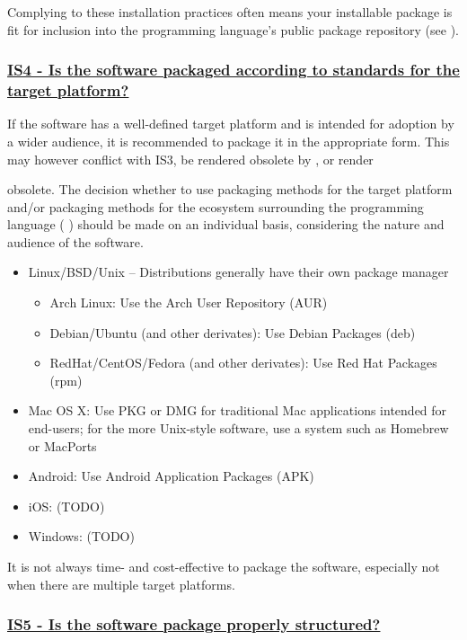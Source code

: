 \documentclass[a4paper,11pt]{article}
\newcommand{\criterion}[2]{\subsubsection*{\underline{#1 - #2}}\label{id:#1}}
\newcommand\CheckTable{%
  \begin{tabular}{ccccc}
    No & Minimal & Adequate & Good & Perfect \\
    0 & 1 & 2 & 3 & 4 \\
    \hline
    $\square$ & $\square$ & $\square$ & $\square$ & $\square$ \\
  \end{tabular}%
}
\newcommand{\refcrit}[1]{%
 \framebox[1.1\width]{\hyperref[id:#1]{#1}}
}
\begin{document}
Complying to these installation practices often means your installable package
is fit for inclusion into the programming language's public package repository
(see \refcrit{AC5}).


\newcommand{\isFourID}{IS4}
\newcommand{\isFourText}{Is the software packaged according to standards for the target platform?}
\criterion{\isFourID}{\isFourText}

If the software has a well-defined target platform and is intended for adoption
by a wider audience, it is recommended to package it in the appropriate form.
This may however conflict with IS3, be rendered obsolete by \refcrit{IS3}, or
render \refcrit{IS3}
obsolete. The decision whether to use packaging methods for the target platform
and/or packaging methods for the ecosystem surrounding the programming language
(\refcrit{IS3}) should be
made on an individual basis, considering the nature and audience of the
software.

\begin{itemize}
    \item Linux/BSD/Unix -- Distributions generally have their own package manager
    \begin{itemize}
        \item Arch Linux: Use the Arch User Repository (AUR)
        \item Debian/Ubuntu (and other derivates): Use Debian Packages (deb)
        \item RedHat/CentOS/Fedora (and other derivates): Use Red Hat Packages (rpm)
    \end{itemize}
    \item Mac OS X: Use PKG or DMG for traditional Mac applications intended for end-users; for the more Unix-style software, use a system such as Homebrew or MacPorts
    \item Android: Use Android Application Packages (APK)
    \item iOS: (TODO) 
    \item Windows: (TODO) 
\end{itemize}

It is not always time- and cost-effective to package the software, especially not
when there are multiple target platforms. 


\newcommand{\isFiveID}{IS5}
\newcommand{\isFiveText}{Is the software package properly structured?}
\criterion{\isFiveID}{\isFiveText}
\end{document}

